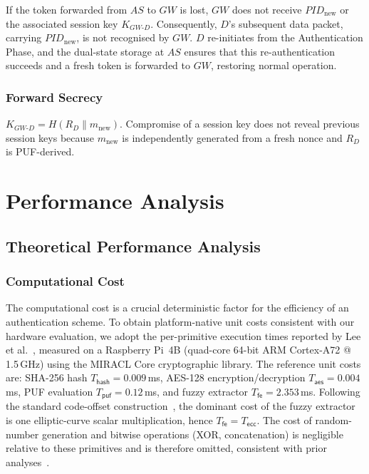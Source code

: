 \documentclass[conference]{IEEEtran}
\begin{document}
If the token forwarded from $AS$ to $GW$ is lost, $GW$ does not receive
$\mathit{PID}_{\mathrm{new}}$ or the associated session key $K_{GW\text{-}D}$.
Consequently, $D$'s subsequent data packet, carrying $\mathit{PID}_{\mathrm{new}}$,
is not recognised by $GW$.  $D$ re-initiates from the Authentication Phase, and the dual-state
storage at $AS$ ensures that this re-authentication succeeds and a fresh
token is forwarded to $GW$, restoring normal operation.

\subsubsection{Forward Secrecy}
$K_{GW\text{-}D} = H(R_D \| m_{\mathrm{new}})$.  Compromise of a session key
does not reveal previous session keys because $m_{\mathrm{new}}$ is
independently generated from a fresh nonce and $R_D$ is PUF-derived.

\FloatBarrier
\section{Performance Analysis}

\subsection{Theoretical Performance Analysis}
\subsubsection{Computational Cost}

The computational cost is a crucial deterministic factor for the efficiency of an
authentication scheme. To obtain platform-native unit costs consistent with our hardware
evaluation, we adopt the per-primitive execution times reported by Lee et
al.~\cite{lee2025plakamd}, measured on a Raspberry Pi~4B (quad-core 64-bit ARM Cortex-A72
@ 1.5\,GHz) using the MIRACL Core cryptographic library. The reference unit costs are:
SHA-256 hash $T_{\mathsf{hash}}=0.009$\,ms, AES-128 encryption/decryption
$T_{\mathsf{aes}}=0.004$\,ms, PUF evaluation $T_{\mathsf{puf}}=0.12$\,ms, and fuzzy
extractor $T_{\mathsf{fe}}=2.353$\,ms. Following the standard code-offset
construction~\cite{dodis2004fuzzy}, the dominant cost of the fuzzy extractor is one
elliptic-curve scalar multiplication, hence $T_{\mathsf{fe}}=T_{\mathsf{ecc}}$. The cost of
random-number generation and bitwise operations (XOR, concatenation) is negligible
relative to these primitives and is therefore omitted, consistent with prior
analyses~\cite{zhou2024auth}.
\end{document}
